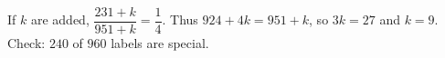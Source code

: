 If $k$ are added, $\dfrac{231+k}{951+k}=\dfrac{1}{4}$. Thus $924+4k=951+k$, so $3k=27$ and $\boxed{k=9}$. Check: $240$ of $960$ labels are special.
